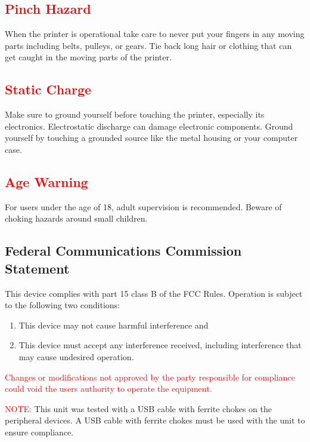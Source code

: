 \subsection{\textcolor{red}{Pinch Hazard}}

When the printer is operational take care to never put your fingers in any moving parts including belts, pulleys, or gears. Tie back long hair or clothing that can get caught in the moving parts of the printer.

\subsection{\textcolor{red}{Static Charge}}
Make sure to ground yourself before touching the printer, especially its electronics. Electrostatic discharge can damage electronic components. Ground yourself by touching a grounded source like the metal housing or your computer case.

\subsection{\textcolor{red}{Age Warning}}

For users under the age of 18, adult supervision is recommended. Beware of choking hazards around small children.

\subsection{Federal Communications Commission Statement}
This device complies with part 15 class B of the FCC Rules. Operation is subject to the following two conditions:
\begin{enumerate}
\item This device may not cause harmful interference and
\item This device must accept any interference received, including interference that may cause undesired operation.
\end{enumerate}

\textcolor{red}{Changes or modifications not approved by the party responsible for compliance could void the users authority to operate the equipment.}

\textcolor{red}{NOTE:} This unit was tested with a USB cable with ferrite chokes on the peripheral devices. A USB cable with ferrite chokes must be used with the unit to ensure compliance.


